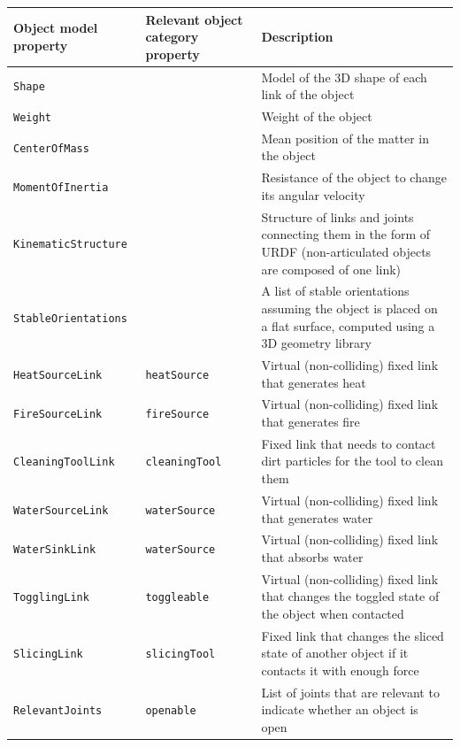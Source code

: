 \begin{table}[!htbp]
\begin{center}
{%
\scriptsize
\renewcommand{\arraystretch}{1.2}
\begin{tabular}{ | m{2.5cm} | m{2.7cm} | m{7.5cm} | } 
\hline
\textbf{Object model property} & \textbf{Relevant object category property} & \textbf{Description} \\ 
\hline
\texttt{Shape} &  & Model of the 3D shape of each link of the object\\ 
\hline
\texttt{Weight} &  & Weight of the object \\ 
\hline
\texttt{CenterOfMass} &  & Mean position of the matter in the object\\ 
\hline
\texttt{MomentOfInertia} &  & Resistance of the object to change its angular velocity\\ 
\hline
\texttt{KinematicStructure} &  & Structure of links and joints connecting them in the form of URDF (non-articulated objects are composed of one link)\\ 
\hline
\texttt{StableOrientations} &  & A list of stable orientations assuming the object is placed on a flat surface, computed using a 3D geometry library\\ 
\hline
\texttt{HeatSourceLink} & \texttt{heatSource} & Virtual (non-colliding) fixed link that generates heat\\
\hline
\texttt{FireSourceLink} & \texttt{fireSource} & Virtual (non-colliding) fixed link that generates fire\\
\hline
\texttt{CleaningToolLink} & \texttt{cleaningTool} & Fixed link that needs to contact dirt particles for the tool to clean them\\ 
\hline
\texttt{WaterSourceLink} &  \texttt{waterSource} & Virtual (non-colliding) fixed link that generates water\\
\hline
\texttt{WaterSinkLink} &  \texttt{waterSource} & Virtual (non-colliding) fixed link that absorbs water\\ 
\hline
\texttt{TogglingLink} &  \texttt{toggleable} & Virtual (non-colliding) fixed link that changes the toggled state of the object when contacted\\ 
\hline
\texttt{SlicingLink} & \texttt{slicingTool} & Fixed link that changes the sliced state of another object if it contacts it with enough force\\ 
\hline
\texttt{RelevantJoints} & \texttt{openable} & List of joints that are relevant to indicate whether an object is open\\ 

\end{tabular}}
\end{center}
\end{table}
